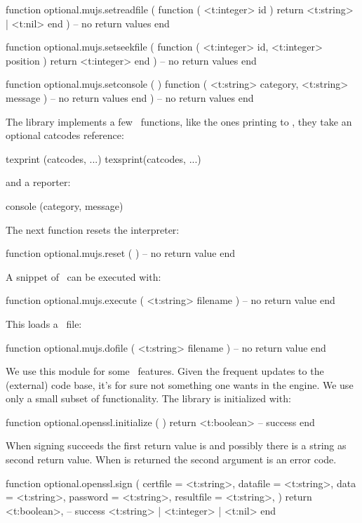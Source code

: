 function optional.mujs.setreadfile (
    function ( <t:integer> id )
        return <t:string> | <t:nil>
    end
)
    -- no return values
end

function optional.mujs.setseekfile (
    function ( <t:integer> id, <t:integer> position )
        return <t:integer>
    end
)
    -- no return values
end

function optional.mujs.setconsole ( )
    function ( <t:string> category, <t:string> message )
        -- no return values
    end
)
    -- no return values
end
\stoptyping

The library implements a few \JAVASCRIPT\ functions, like the ones
printing to \TEX, they take an optional catcodes reference:

\starttyping
texprint (catcodes, ...)
texsprint(catcodes, ...)
\stoptyping

and a reporter:

\starttyping
console  (category, message)
\stoptyping

The next function resets the interpreter:

\starttyping[option=LUA]
function optional.mujs.reset ( )
    -- no return value
end
\stoptyping

A snippet of \JAVASCRIPT\ can be executed with:

\starttyping[option=LUA]
function optional.mujs.execute ( <t:string> filename )
    -- no return value
end
\stoptyping

This loads a \JAVASCRIPT\ file:

\starttyping[option=LUA]
function optional.mujs.dofile ( <t:string> filename )
    -- no return value
end
\stoptyping

\stopsubsubsubject

\startsubsubsubject[title=openssl]

We use this module for some \PDF\ features. Given the frequent updates to the
(external) code base, it's for sure not something one wants in the engine. We use
only a small subset of functionality. The library is initialized with:

\starttyping[option=LUA]
function optional.openssl.initialize ( )
    return <t:boolean> -- success
end
\stoptyping

When signing succeeds the first return value is  and possibly there
is a string as second return value. When  is returned the second
argument is an error code.

\starttyping[option=LUA]
function optional.openssl.sign (
    {
        certfile   = <t:string>,
        datafile   = <t:string>,
        data       = <t:string>,
        password   = <t:string>,
        resultfile = <t:string>,
    }
)
    return
        <t:boolean>, -- success
        <t:string> | <t:integer> | <t:nil>
end
\stoptyping


